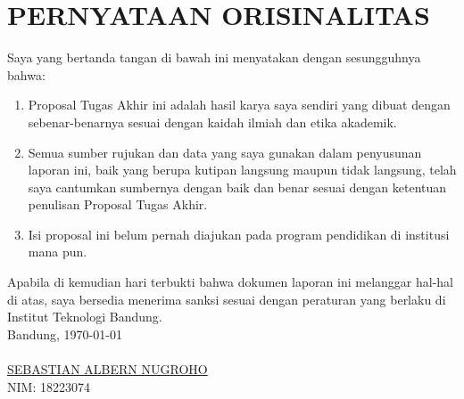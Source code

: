\chapter*{PERNYATAAN ORISINALITAS}
\vspace{2cm}
Saya yang bertanda tangan di bawah ini menyatakan dengan sesungguhnya bahwa:
\begin{enumerate}
    \item Proposal Tugas Akhir ini adalah hasil karya saya sendiri yang dibuat dengan sebenar-benarnya sesuai dengan kaidah ilmiah dan etika akademik.
    \item Semua sumber rujukan dan data yang saya gunakan dalam penyusunan laporan ini, baik yang berupa kutipan langsung maupun tidak langsung, telah saya cantumkan sumbernya dengan baik dan benar sesuai dengan ketentuan penulisan Proposal Tugas Akhir.
    \item Isi proposal ini belum pernah diajukan pada program pendidikan di institusi mana pun.
\end{enumerate}
Apabila di kemudian hari terbukti bahwa dokumen laporan ini melanggar hal-hal di atas, saya bersedia menerima sanksi sesuai dengan peraturan yang berlaku di Institut Teknologi Bandung.
\\[2cm]
Bandung, \today\\
\\[2cm]

\underline{SEBASTIAN ALBERN NUGROHO} \\
NIM: 18223074
